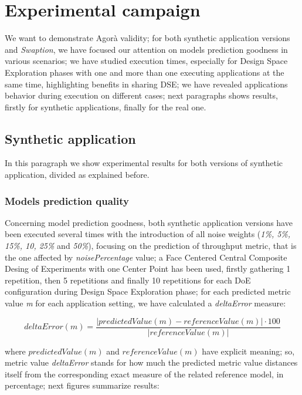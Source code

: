 \section{Experimental campaign}\label{campaign}

We want to demonstrate Agorà validity; for both synthetic application versions and \textit{Swaption}, we have focused our attention on models prediction goodness in various scenarios; we have studied execution times, especially for Design Space Exploration phases with one and more than one executing applications at the same time, highlighting benefits in sharing DSE; we have revealed applications behavior during execution on different cases; next paragraphs shows results, firstly for synthetic applications, finally for the real one.


\subsection{Synthetic application}

In this paragraph we show experimental results for both versions of synthetic application, divided as explained before.


\subsubsection{Models prediction quality}\label{deltaErrorExplanation}

Concerning model prediction goodness, both synthetic application versions have been executed several times with the introduction of all noise weights (\textit{1\%, 5\%, 15\%, 10, 25\%} and \textit{50\%}), focusing on the prediction of throughput metric, that is the one affected by \textit{noisePercentage} value; a Face Centered Central Composite Desing of Experiments with one Center Point has been used, firstly gathering 1 repetition, then 5 repetitions and finally 10 repetitions for each DoE configuration during Design Space Exploration phase; for each predicted metric value \textit{m} for each application setting, we have calculated a \textit{deltaError} measure:

\[
deltaError(m) = \dfrac{\left\vert predictedValue(m) - referenceValue(m) \right\vert \cdot 100}{\left\vert referenceValue(m) \right\vert}
\]

where $predictedValue(m)$ and $referenceValue(m)$ have explicit meaning; so, metric value \textit{deltaError} stands for how much the predicted metric value distances itself from the corresponding exact measure of the related reference model, in percentage; next figures summarize results:





